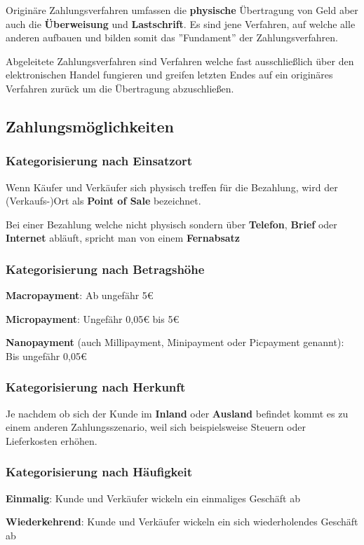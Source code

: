 Originäre Zahlungsverfahren umfassen die \textbf{physische} Übertragung von Geld aber auch die \textbf{Überweisung} und \textbf{Lastschrift}. Es sind jene Verfahren, auf welche alle anderen aufbauen und bilden somit das ''Fundament'' der Zahlungsverfahren.

Abgeleitete Zahlungsverfahren sind Verfahren welche fast ausschließlich über den elektronischen Handel fungieren und greifen letzten Endes auf ein originäres Verfahren zurück um die Übertragung abzuschließen.

\subsection{Zahlungsmöglichkeiten}
\subsubsection{Kategorisierung nach Einsatzort}
Wenn Käufer und Verkäufer sich physisch treffen für die Bezahlung, wird der (Verkaufs-)Ort als \textbf{Point of Sale} bezeichnet.

Bei einer Bezahlung welche nicht physisch sondern über \textbf{Telefon}, \textbf{Brief} oder \textbf{Internet} abläuft, spricht man von einem \textbf{Fernabsatz}

\subsubsection{Kategorisierung nach Betragshöhe}
\textbf{Macropayment}: Ab ungefähr 5€

\textbf{Micropayment}: Ungefähr 0,05€ bis 5€

\textbf{Nanopayment} (auch Millipayment, Minipayment oder Picpayment genannt): Bis ungefähr 0,05€ 

\subsubsection{Kategorisierung nach Herkunft}
Je nachdem ob sich der Kunde im \textbf{Inland} oder \textbf{Ausland} befindet kommt es zu einem anderen Zahlungsszenario, weil sich beispielsweise Steuern oder Lieferkosten erhöhen.


\subsubsection{Kategorisierung nach Häufigkeit}
\textbf{Einmalig}: Kunde und Verkäufer wickeln ein einmaliges Geschäft ab

\textbf{Wiederkehrend}: Kunde und Verkäufer wickeln ein sich wiederholendes Geschäft ab
 
